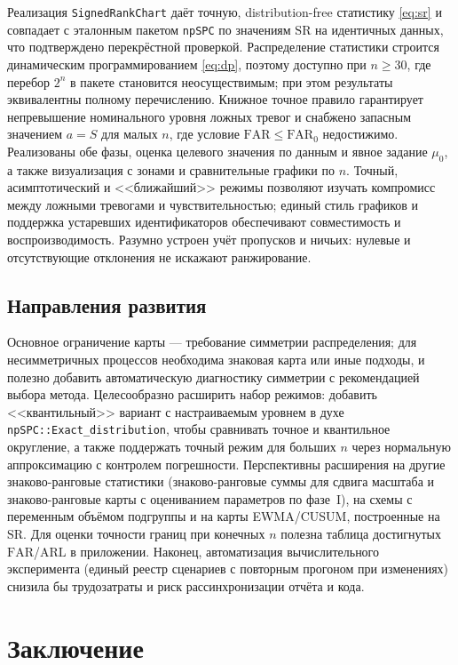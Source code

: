 \documentclass[11pt,a4paper]{article}
\newcommand{\SR}{\mathrm{SR}}
\newcommand{\FAR}{\mathrm{FAR}}
\newcommand{\ARL}{\mathrm{ARL}}
\newcommand{\FARz}{\mathrm{FAR}_0}
\begin{document}
Реализация \texttt{SignedRankChart} даёт точную, distribution-free
статистику \eqref{eq:sr} и совпадает с эталонным пакетом \texttt{npSPC} по
значениям $\SR$ на идентичных данных, что подтверждено перекрёстной
проверкой. Распределение статистики строится динамическим
программированием \eqref{eq:dp}, поэтому доступно при $n\ge30$, где
перебор $2^n$ в пакете становится неосуществимым; при этом результаты
эквивалентны полному перечислению. Книжное точное правило
гарантирует непревышение номинального уровня ложных тревог и снабжено
запасным значением $a=S$ для малых $n$, где условие $\FAR\le\FARz$
недостижимо. Реализованы обе фазы, оценка целевого значения по данным и
явное задание $\mu_0$, а также визуализация с зонами и сравнительные
графики по $n$. Точный, асимптотический и <<ближайший>> режимы
позволяют изучать компромисс между ложными тревогами и чувствительностью;
единый стиль графиков и поддержка устаревших идентификаторов
обеспечивают совместимость и воспроизводимость. Разумно устроен учёт
пропусков и ничьих: нулевые и отсутствующие отклонения не искажают
ранжирование.

\subsection{Направления развития}
\label{sec:future}

Основное ограничение карты --- требование симметрии распределения; для
несимметричных процессов необходима знаковая карта или иные подходы, и
полезно добавить автоматическую диагностику симметрии с рекомендацией
выбора метода. Целесообразно расширить набор режимов: добавить
<<квантильный>> вариант с настраиваемым уровнем в духе
\texttt{npSPC::Exact\_distribution}, чтобы сравнивать точное и
квантильное округление, а также поддержать точный режим для больших $n$
через нормальную аппроксимацию с контролем погрешности. Перспективны
расширения на другие знаково-ранговые статистики (знаково-ранговые суммы
для сдвига масштаба и знаково-ранговые карты с оцениванием параметров по
фазе~I), на схемы с переменным объёмом подгруппы и на карты
EWMA/CUSUM, построенные на $\SR$. Для оценки точности границ при конечных
$n$ полезна таблица достигнутых $\FAR$/$\ARL$ в приложении. Наконец,
автоматизация вычислительного эксперимента (единый реестр сценариев с
повторным прогоном при изменениях) снизила бы трудозатраты и риск
рассинхронизации отчёта и кода.

\section{Заключение}
\label{sec:conclusion}
\end{document}
